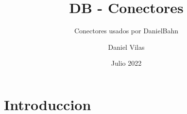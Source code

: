 \documentclass[spanish]{DccDiyTools}
\title{DB - Conectores}
\subtitle{Conectores usados por DanielBahn}
\author{Daniel Vilas}
\date{Julio 2022}
\begin{document}
\maketitle
\section{Introduccion}

\end{document}
